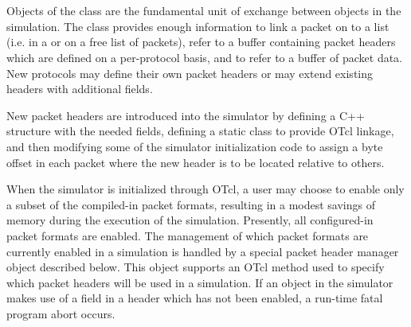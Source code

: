 %
%
\section{}

Objects of the class  are the fundamental unit of
exchange between objects in the simulation.
The  class provides enough information to
link a packet on to a list (i.e. in a  or on a free
list of packets), refer to a buffer containing packet headers
which are defined on a per-protocol basis, and to refer to a buffer
of packet data.
New protocols may define their own packet headers or may extend
existing headers with additional fields.

New packet headers are introduced into the simulator
by defining a C++ structure with the needed
fields, defining a static class to provide
OTcl linkage, and then modifying some of the simulator initialization
code to assign a byte offset in each packet where the new header
is to be located relative to others.

When the simulator is initialized through OTcl,
a user may choose to enable
only a subset of the compiled-in packet formats, resulting in
a modest savings of memory during the execution of the simulation.
Presently, all configured-in packet formats are enabled.
The management of which packet formats are currently enabled
in a simulation is handled by a special packet header manager
object described below.
This object supports an OTcl method used to specify
which packet headers will be used in a simulation.
If an object in the simulator makes use of a field in a header
which has not been enabled, a run-time fatal program abort occurs.

\subsection{}

